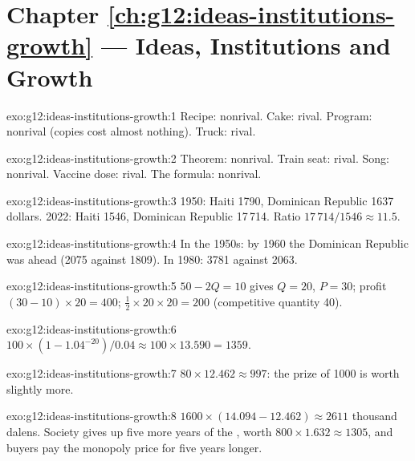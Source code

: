 \section*{Chapter \ref{ch:g12:ideas-institutions-growth} --- Ideas, Institutions and Growth}

\begin{solution}{exo:g12:ideas-institutions-growth:1}
Recipe: nonrival. Cake: rival. Program: nonrival (copies cost almost nothing). Truck: rival.
\end{solution}

\begin{solution}{exo:g12:ideas-institutions-growth:2}
Theorem: nonrival. Train seat: rival. Song: nonrival. Vaccine dose: rival. The formula: nonrival.
\end{solution}

\begin{solution}{exo:g12:ideas-institutions-growth:3}
1950: Haiti 1790, Dominican Republic 1637 dollars. 2022: Haiti 1546, Dominican Republic 17\,714. Ratio $17\,714/1546 \approx 11.5$.
\end{solution}

\begin{solution}{exo:g12:ideas-institutions-growth:4}
In the 1950s: by 1960 the Dominican Republic was ahead (2075 against 1809). In 1980: 3781 against 2063.
\end{solution}

\begin{solution}{exo:g12:ideas-institutions-growth:5}
 $50 - 2Q = 10$ gives $Q = 20$, $P = 30$; profit $(30 - 10) \times 20 = 400$;  $\tfrac12 \times 20 \times 20 = 200$ (competitive quantity 40).
\end{solution}

\begin{solution}{exo:g12:ideas-institutions-growth:6}
$100 \times (1 - 1.04^{-20})/0.04 \approx 100 \times 13.590 = 1359$.
\end{solution}

\begin{solution}{exo:g12:ideas-institutions-growth:7}
$80 \times 12.462 \approx 997$: the prize of 1000 is worth slightly more.
\end{solution}

\begin{solution}{exo:g12:ideas-institutions-growth:8}
$1600 \times (14.094 - 12.462) \approx 2611$ thousand dalens. Society gives up five more years of the , worth $800 \times 1.632 \approx 1305$, and buyers pay the
monopoly price for five years longer.
\end{solution}

